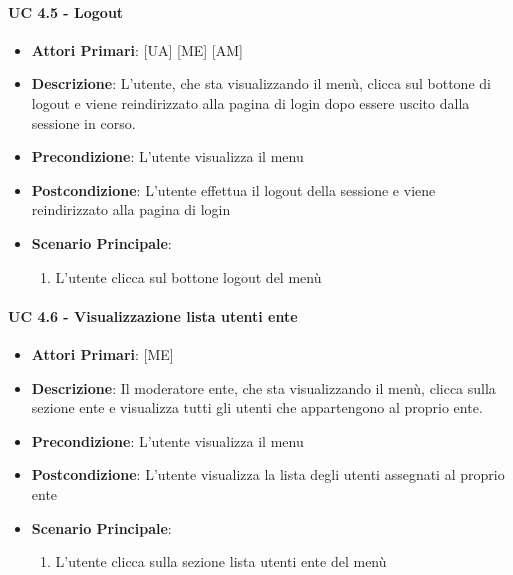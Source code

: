 			\paragraph{UC 4.5 - Logout}
			\begin{itemize}
				\item \textbf{Attori Primari}: [UA] [ME] [AM]
				\item \textbf{Descrizione}: L'utente, che sta visualizzando il menù, clicca sul bottone di logout e viene reindirizzato alla pagina di login dopo essere uscito dalla sessione in corso. 
				\item \textbf{Precondizione}: L'utente visualizza il menu
				\item \textbf{Postcondizione}: L'utente effettua il logout della sessione e viene reindirizzato alla pagina di login
				\item \textbf{Scenario Principale}:
				\begin{enumerate}
					\item{L'utente clicca sul bottone logout del menù}
				\end{enumerate}	
			\end{itemize}

			\paragraph{UC 4.6 - Visualizzazione lista utenti ente}
			\begin{itemize}
				\item \textbf{Attori Primari}: [ME]
				\item \textbf{Descrizione}: Il moderatore ente, che sta visualizzando il menù, clicca sulla sezione ente e visualizza tutti gli utenti che appartengono al proprio ente.
				\item \textbf{Precondizione}: L'utente visualizza il menu
				\item \textbf{Postcondizione}: L'utente visualizza la lista degli utenti assegnati al proprio ente
				\item \textbf{Scenario Principale}:
				\begin{enumerate}
					\item{L'utente clicca sulla sezione lista utenti ente del menù}
				\end{enumerate}	
			\end{itemize}

